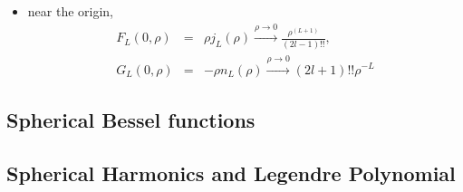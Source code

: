 \documentclass[10pt]{book}
\newcommand{\bea}{\begin{eqnarray}}
\newcommand{\eea}{\end{eqnarray}}
\newcommand{\no}{\nonumber \\}
\begin{document}
\begin{itemize}
\item near the origin,
\bea 
F_L(0,\rho)&=&\rho j_L(\rho)\xrightarrow{\rho\to 0} \frac{\rho^{(L+1)}}{(2l-1)!!},\no 
G_L(0,\rho)&=&-\rho n_L(\rho) \xrightarrow{\rho\to 0} (2l+1)!! \rho^{-L}
\eea 
  
\end{itemize}

\subsection{Spherical Bessel functions}
\subsection{Spherical Harmonics and Legendre Polynomial}
\end{document}
